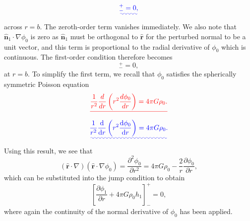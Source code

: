 \documentclass[a4paper,10pt]{paper}
\providecommand{\DIFadd}[1]{{\protect\color{blue}\uwave{#1}}} %
\providecommand{\DIFdel}[1]{{\protect\color{red}\sout{#1}}}                      %
\providecommand{\DIFaddbegin}{} %
\providecommand{\DIFaddend}{} %
\providecommand{\DIFdelbegin}{} %
\providecommand{\DIFdelend}{} %
\begin{document}
\begin{enumerate}
\begin{equation*}
    [\DIFadd{\hat{\mathbf{r}}\cdot\nabla\phi_{0}+s(\hat{\mathbf{r}}\cdot\nabla)(\hat{\mathbf{r}}\cdot\nabla\phi_{0})h_{1}+s\hat{\mathbf{n}}_{1}\cdot\nabla\phi_{0}+s\hat{\mathbf{r}}\cdot\nabla\phi_{1}+\cdots}]\DIFadd{_{-}^{+}=0,
}\end{equation*}\DIFaddend 
across $r=b$. The zeroth-order term vanishes immediately. We also note that $\hat{\mathbf{n}}_{1}\cdot\nabla\phi_{0}$ is zero as $\hat{\mathbf{n}}_{1}$ must be orthogonal to $\hat{\mathbf{r}}$ for the perturbed normal to be a unit vector, and this term is proportional to the radial derivative of $\phi_{0}$ which is continuous. The first-order condition therefore becomes
\begin{equation*}
    [(\hat{\mathbf{r}}\cdot\nabla)(\hat{\mathbf{r}}\cdot\nabla\phi_{0})h_{1}+\hat{\mathbf{r}}\cdot\nabla\phi_{1}]_{-}^{+}=0,
\end{equation*}
at $r=b$. To simplify the first term, we recall that $\phi_{0}$ satisfies the spherically symmetric Poisson equation
\DIFdelbegin \begin{displaymath}
    \DIFdel{\frac{1}{r^{2}}\frac{d}{dr}\left(r^{2}\frac{d\phi_{0}}{dr}\right)=4\pi G\rho_{0}.
}\end{displaymath}%
\DIFdelend \DIFaddbegin \begin{equation*}
    \DIFadd{\frac{1}{r^{2}}\frac{\ddns}{\ddns r}\left(r^{2}\frac{\ddns\phi_{0}}{\ddns r}\right)=4\pi G\rho_{0}.
}\end{equation*}\DIFaddend 
Using this result, we see that
\begin{equation*}
    (\hat{\mathbf{r}}\cdot\nabla)(\hat{\mathbf{r}}\cdot\nabla\phi_{0}) = \frac{\partial^{2}\phi_{0}}{\partial r^{2}}=4\pi G\rho_{0}-\frac{2}{r}\frac{\partial\phi_{0}}{\partial r},
\end{equation*}
which can be substituted into the jump condition to obtain
\begin{equation*}
    \left[\frac{\partial\phi_{1}}{\partial r}+4\pi G\rho_{0}h_{1}\right]_{-}^{+}=0,
\end{equation*}
where again the continuity of the normal derivative of $\phi_{0}$ has been applied.





\end{enumerate}
\end{document}
